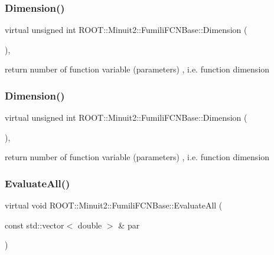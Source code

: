 \subsubsection{\texorpdfstring{Dimension()}{Dimension()}\hspace{0.1cm}{\footnotesize\ttfamily [1/2]}}
{\footnotesize\ttfamily virtual unsigned int R\+O\+O\+T\+::\+Minuit2\+::\+Fumili\+F\+C\+N\+Base\+::\+Dimension (\begin{DoxyParamCaption}{ }\end{DoxyParamCaption})\hspace{0.3cm}{\ttfamily [inline]}, {\ttfamily [virtual]}}

return number of function variable (parameters) , i.\+e. function dimension \mbox{\label{classROOT_1_1Minuit2_1_1FumiliFCNBase_ab8056ffdfd619915e22f1310db0644a6}} 
\subsubsection{\texorpdfstring{Dimension()}{Dimension()}\hspace{0.1cm}{\footnotesize\ttfamily [2/2]}}
{\footnotesize\ttfamily virtual unsigned int R\+O\+O\+T\+::\+Minuit2\+::\+Fumili\+F\+C\+N\+Base\+::\+Dimension (\begin{DoxyParamCaption}{ }\end{DoxyParamCaption})\hspace{0.3cm}{\ttfamily [inline]}, {\ttfamily [virtual]}}

return number of function variable (parameters) , i.\+e. function dimension \mbox{\label{classROOT_1_1Minuit2_1_1FumiliFCNBase_a0741bb4a7405cc33ab60583472a189cb}} 
\subsubsection{\texorpdfstring{EvaluateAll()}{EvaluateAll()}\hspace{0.1cm}{\footnotesize\ttfamily [1/2]}}
{\footnotesize\ttfamily virtual void R\+O\+O\+T\+::\+Minuit2\+::\+Fumili\+F\+C\+N\+Base\+::\+Evaluate\+All (\begin{DoxyParamCaption}\item[{const std\+::vector$<$ double $>$ \&}]{par }\end{DoxyParamCaption})\hspace{0.3cm}{\ttfamily [pure virtual]}}

